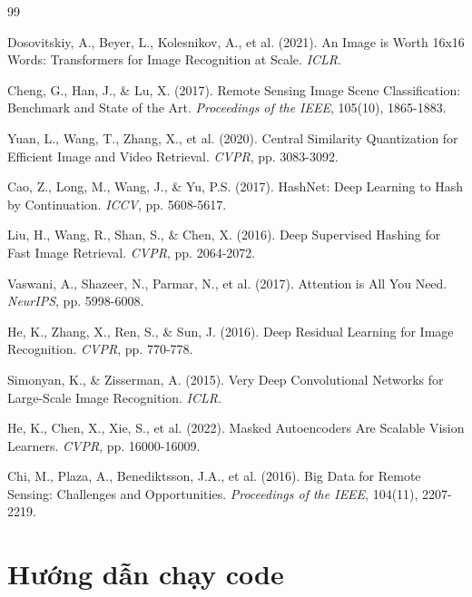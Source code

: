 \documentclass[12pt,a4paper]{article}
\begin{document}
\newpage
\begin{thebibliography}{99}

Dosovitskiy, A., Beyer, L., Kolesnikov, A., et al. (2021). 
An Image is Worth 16x16 Words: Transformers for Image Recognition at Scale. 
\textit{ICLR}.

Cheng, G., Han, J., \& Lu, X. (2017). 
Remote Sensing Image Scene Classification: Benchmark and State of the Art. 
\textit{Proceedings of the IEEE}, 105(10), 1865-1883.

Yuan, L., Wang, T., Zhang, X., et al. (2020). 
Central Similarity Quantization for Efficient Image and Video Retrieval. 
\textit{CVPR}, pp. 3083-3092.

Cao, Z., Long, M., Wang, J., \& Yu, P.S. (2017). 
HashNet: Deep Learning to Hash by Continuation. 
\textit{ICCV}, pp. 5608-5617.

Liu, H., Wang, R., Shan, S., \& Chen, X. (2016). 
Deep Supervised Hashing for Fast Image Retrieval. 
\textit{CVPR}, pp. 2064-2072.

Vaswani, A., Shazeer, N., Parmar, N., et al. (2017). 
Attention is All You Need. 
\textit{NeurIPS}, pp. 5998-6008.

He, K., Zhang, X., Ren, S., \& Sun, J. (2016). 
Deep Residual Learning for Image Recognition. 
\textit{CVPR}, pp. 770-778.

Simonyan, K., \& Zisserman, A. (2015). 
Very Deep Convolutional Networks for Large-Scale Image Recognition. 
\textit{ICLR}.

He, K., Chen, X., Xie, S., et al. (2022). 
Masked Autoencoders Are Scalable Vision Learners. 
\textit{CVPR}, pp. 16000-16009.

Chi, M., Plaza, A., Benediktsson, J.A., et al. (2016). 
Big Data for Remote Sensing: Challenges and Opportunities. 
\textit{Proceedings of the IEEE}, 104(11), 2207-2219.

\end{thebibliography}


\appendix
\newpage
\section{Hướng dẫn chạy code}
\end{document}
